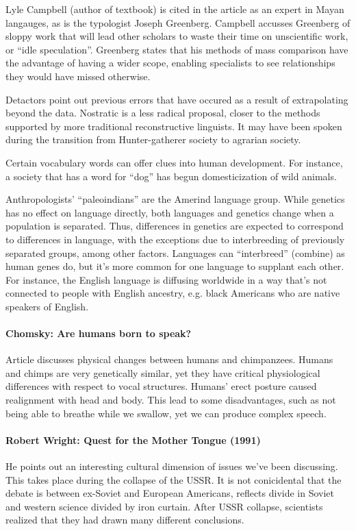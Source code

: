 \documentclass{exam}
\begin{document}
Lyle Campbell (author of textbook) is cited in the article as an expert in Mayan langauges, as is the typologist Joseph Greenberg.
Campbell accusses Greenberg of sloppy work that will lead other scholars to waste their time on unscientific work, or ``idle speculation''.
Greenberg states that his methods of mass comparison have the advantage of having a wider scope, enabling specialists to see relationships they would have missed otherwise.

Detactors point out previous errors that have occured as a result of extrapolating beyond the data.
Nostratic is a less radical proposal, closer to the methods supported by more traditional reconstructive linguists. 
It may have been spoken during the transition from Hunter-gatherer society to agrarian society. 

Certain vocabulary words can offer clues into human development. 
For instance, a society that has a word for ``dog'' has begun domesticization of wild animals. 

Anthropologists' ``paleoindians'' are the Amerind language group.
While genetics has no effect on language directly, both languages and genetics change when a population is separated.
Thus, differences in genetics are expected to correspond to differences in language, with the exceptions due to interbreeding of previously separated groups, among other factors. 
Languages can ``interbreed'' (combine) as human genes do, but it's more common for one language to supplant each other.
For instance, the English language is diffusing worldwide in a way that's not connected to people with English ancestry, e.g. black Americans who are native speakers of English. 

\paragraph{Chomsky: Are humans born to speak?}

Article discusses physical changes between humans and chimpanzees. 
Humans and chimps are very genetically similar, yet they have critical physiological differences with respect to vocal structures. 
Humans' erect posture caused realignment with head and body.
This lead to some disadvantages, such as not being able to breathe while we swallow, yet we can produce complex speech. 


\paragraph{Robert Wright: Quest for the Mother Tongue (1991)}
He points out an interesting cultural dimension of issues we've been discussing. 
This takes place during the collapse of the USSR. 
It is not conicidental that the debate is between ex-Soviet and European Americans, reflects divide in Soviet and western science divided by iron curtain. 
After USSR collapse, scientists realized that they had drawn many different conclusions. 
\end{document}
